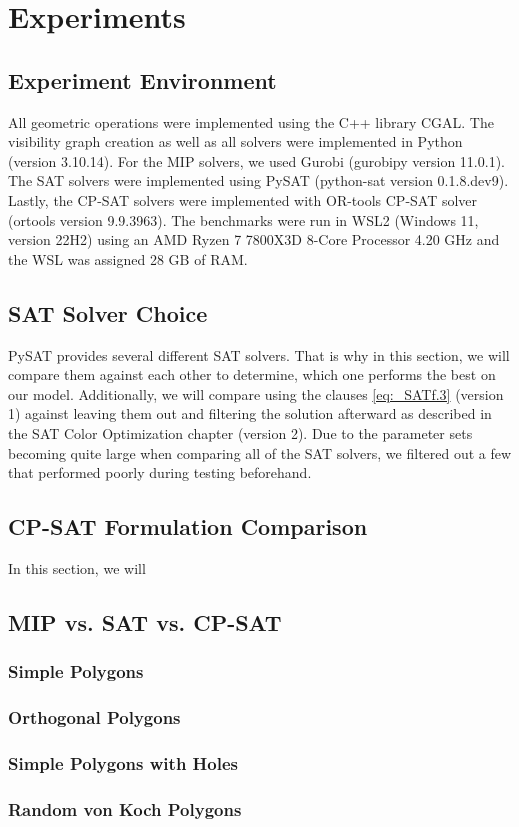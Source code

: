 \chapter{Experiments}
\section{Experiment Environment}
All geometric operations were implemented using the C++ library CGAL. The visibility graph creation as well as all solvers were implemented in Python (version 3.10.14). For the MIP solvers, we used Gurobi (gurobipy version 11.0.1). The SAT solvers were implemented using PySAT (python-sat version 0.1.8.dev9). Lastly, the CP-SAT solvers were implemented with OR-tools CP-SAT solver (ortools version 9.9.3963).
The benchmarks were run in WSL2 (Windows 11, version 22H2) using an AMD Ryzen 7 7800X3D 8-Core Processor 4.20 GHz and the WSL was assigned 28 GB of RAM.

\section{SAT Solver Choice}
PySAT provides several different SAT solvers. That is why in this section, we will compare them against each other to determine, which one performs the best on our model. Additionally, we will compare using the clauses \cref{eq:_SATf.3} (version 1) against leaving them out and filtering the solution afterward as described in the SAT Color Optimization chapter (version 2). Due to the parameter sets becoming quite large when comparing all of the SAT solvers, we filtered out a few that performed poorly during testing beforehand.

\section{CP-SAT Formulation Comparison}
In this section, we will 

\section{MIP vs. SAT vs. CP-SAT}

\subsection{Simple Polygons}

\subsection{Orthogonal Polygons}

\subsection{Simple Polygons with Holes}

\subsection{Random von Koch Polygons}
